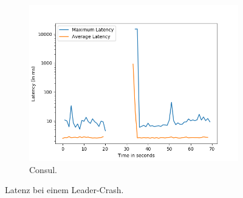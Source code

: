\begin{figure}[t]
\begin{subfigure}[t]{0.45\textwidth}
		\includegraphics[width=\textwidth]{img/leader_crash_consul.png}
		\caption{Consul.}
	\end{subfigure}
	\caption{Latenz bei einem Leader-Crash.}
\end{figure}

